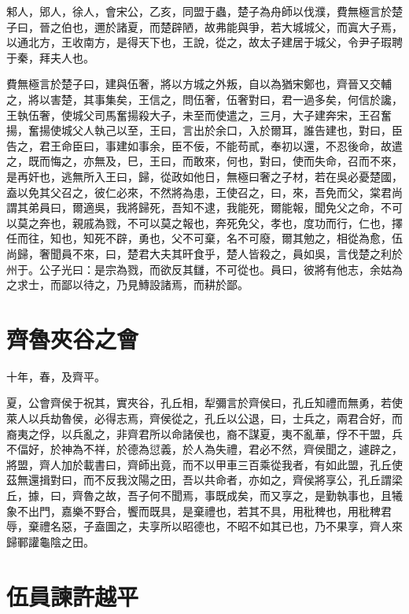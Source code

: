 \documentclass{article}
\begin{document}
邾人，郳人，徐人，會宋公，乙亥，同盟于蟲，楚子為舟師以伐濮，費無極言於楚子曰，晉之伯也，邇於諸夏，而楚辟陋，故弗能與爭，若大城城父，而寘大子焉，以通北方，王收南方，是得天下也，王說，從之，故太子建居于城父，令尹子瑕聘于秦，拜夫人也。

費無極言於楚子曰，建與伍奢，將以方城之外叛，自以為猶宋鄭也，齊晉又交輔之，將以害楚，其事集矣，王信之，問伍奢，伍奢對曰，君一過多矣，何信於讒，王執伍奢，使城父司馬奮揚殺大子，未至而使遣之，三月，大子建奔宋，王召奮揚，奮揚使城父人執己以至，王曰，言出於余口，入於爾耳，誰告建也，對曰，臣告之，君王命臣曰，事建如事余，臣不佞，不能苟貳，奉初以還，不忍後命，故遣之，既而悔之，亦無及，巳，王曰，而敢來，何也，對曰，使而失命，召而不來，是再奸也，逃無所入王曰，歸，從政如他日，無極曰奢之子材，若在吳必憂楚國，盍以免其父召之，彼仁必來，不然將為患，王使召之，曰，來，吾免而父，棠君尚謂其弟員曰，爾適吳，我將歸死，吾知不逮，我能死，爾能報，聞免父之命，不可以莫之奔也，親戚為戮，不可以莫之報也，奔死免父，孝也，度功而行，仁也，擇任而往，知也，知死不辟，勇也，父不可棄，名不可廢，爾其勉之，相從為愈，伍尚歸，奢聞員不來，曰，楚君大夫其旰食乎，楚人皆殺之，員如吳，言伐楚之利於州于。公子光曰：是宗為戮，而欲反其讎，不可從也。員曰，彼將有他志，余姑為之求士，而鄙以待之，乃見鱄設諸焉，而耕於鄙。

\section{齊魯夾谷之會}

十年，春，及齊平。

夏，公會齊侯于祝其，實夾谷，孔丘相，犁彌言於齊侯曰，孔丘知禮而無勇，若使萊人以兵劫魯侯，必得志焉，齊侯從之，孔丘以公退，曰，士兵之，兩君合好，而裔夷之俘，以兵亂之，非齊君所以命諸侯也，裔不謀夏，夷不亂華，俘不干盟，兵不偪好，於神為不祥，於德為愆義，於人為失禮，君必不然，齊侯聞之，遽辟之，將盟，齊人加於載書曰，齊師出竟，而不以甲車三百乘從我者，有如此盟，孔丘使茲無還揖對曰，而不反我汶陽之田，吾以共命者，亦如之，齊侯將享公，孔丘謂梁丘，據，曰，齊魯之故，吾子何不聞焉，事既成矣，而又享之，是勤執事也，且犧象不出門，嘉樂不野合，饗而既具，是棄禮也，若其不具，用秕稗也，用秕稗君辱，棄禮名惡，子盍圖之，夫享所以昭德也，不昭不如其已也，乃不果享，齊人來歸鄆讙龜陰之田。

\section{伍員諫許越平}
\end{document}
